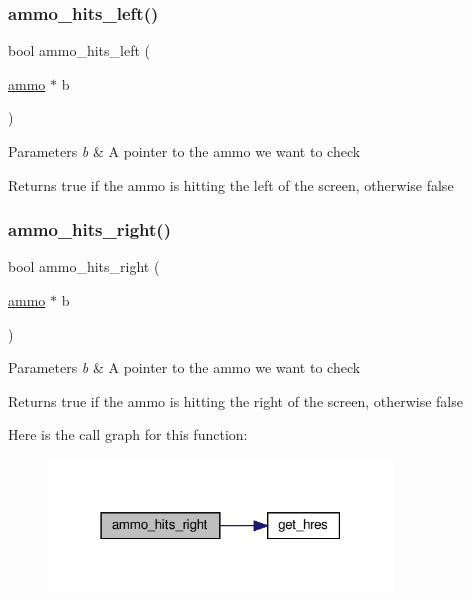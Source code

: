 \subsubsection{\texorpdfstring{ammo\+\_\+hits\+\_\+left()}{ammo\_hits\_left()}}
{\footnotesize\ttfamily bool ammo\+\_\+hits\+\_\+left (\begin{DoxyParamCaption}\item[{\hyperlink{structammo}{ammo} $\ast$}]{b }\end{DoxyParamCaption})}


\begin{DoxyParams}{Parameters}
{\em b} & A pointer to the ammo we want to check \\
\hline
\end{DoxyParams}
\begin{DoxyReturn}{Returns}
true if the ammo is hitting the left of the screen, otherwise false 
\end{DoxyReturn}
\mbox{\label{group__ammo_gabab3a68eb48f6e4f339c648f6cec5522}} 
\subsubsection{\texorpdfstring{ammo\+\_\+hits\+\_\+right()}{ammo\_hits\_right()}}
{\footnotesize\ttfamily bool ammo\+\_\+hits\+\_\+right (\begin{DoxyParamCaption}\item[{\hyperlink{structammo}{ammo} $\ast$}]{b }\end{DoxyParamCaption})}


\begin{DoxyParams}{Parameters}
{\em b} & A pointer to the ammo we want to check \\
\hline
\end{DoxyParams}
\begin{DoxyReturn}{Returns}
true if the ammo is hitting the right of the screen, otherwise false 
\end{DoxyReturn}
Here is the call graph for this function\+:\nopagebreak
\begin{figure}[H]
\begin{center}
\leavevmode
\includegraphics[width=259pt]{group__ammo_gabab3a68eb48f6e4f339c648f6cec5522_cgraph}
\end{center}
\end{figure}
\mbox{\label{group__ammo_ga05181ac613d5d6d1d1070031b5461191}} 
